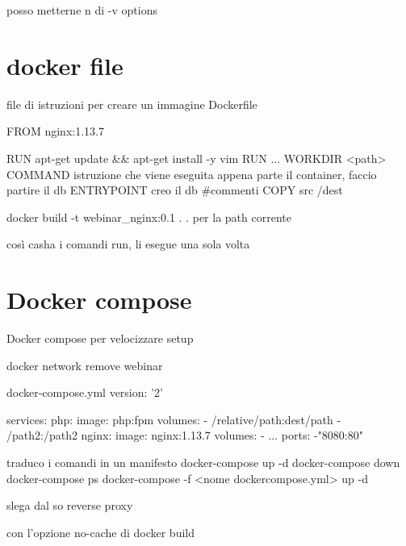 posso metterne n di -v options

\section{docker file}
file di istruzioni per creare un immagine
Dockerfile

FROM nginx:1.13.7

RUN apt-get update && apt-get install -y vim
RUN ...
WORKDIR <path>
COMMAND istruzione che viene eseguita appena parte il container, faccio partire il db
ENTRYPOINT creo il db
#commenti
COPY src /dest

docker build -t webinar_nginx:0.1 .
. per la path corrente

così casha i comandi run, li esegue una sola volta

\section{Docker compose}
Docker compose per velocizzare setup

docker network remove webinar

docker-compose.yml
version: '2'

services:
	php: 
		image: php:fpm
		volumes: 
			- /relative/path:dest/path
			- /path2:/path2
	nginx:
		image: nginx:1.13.7
		volumes:
			- ...
		ports:
			-"8080:80"

traduco i comandi in un manifesto	
docker-compose up -d
docker-compose down
docker-compose ps
docker-compose -f <nome dockercompose.yml> up -d

slega dal so
reverse proxy

con l'opzione no-cache di docker build 

